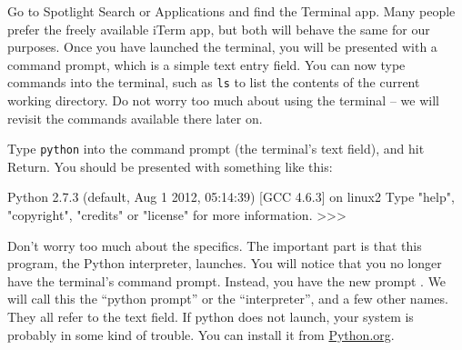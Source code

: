 

Go to Spotlight Search or Applications and find the Terminal app.
Many people prefer the freely available iTerm app, but both will behave the same for our purposes.
Once you have launched the terminal, you will be presented with a command prompt, which is a simple text entry field.
You can now type commands into the terminal, such as \texttt{ls} to list the contents of the current working directory.
Do not worry too much about using the terminal -- we will revisit the commands available there later on.

Type \texttt{python} into the command prompt (the terminal's text field), and hit Return.
You should be presented with something like this:
\begin{codeblock}
Python 2.7.3 (default, Aug  1 2012, 05:14:39)
[GCC 4.6.3] on linux2
Type "help", "copyright", "credits" or "license" for more information.
>>>
\end{codeblock}
Don't worry too much about the specifics. The important part is that this program, the Python interpreter, launches.
You will notice that you no longer have the terminal's command prompt. Instead, you have the new prompt \pyprompt. We will call this the ``python prompt'' or the ``interpreter'', and a few other names. They all refer to the \pyprompt text field.
If python does not launch, your system is probably in some kind of trouble. You can install it from \href{http://www.python.org/getit/mac/}{Python.org}.

